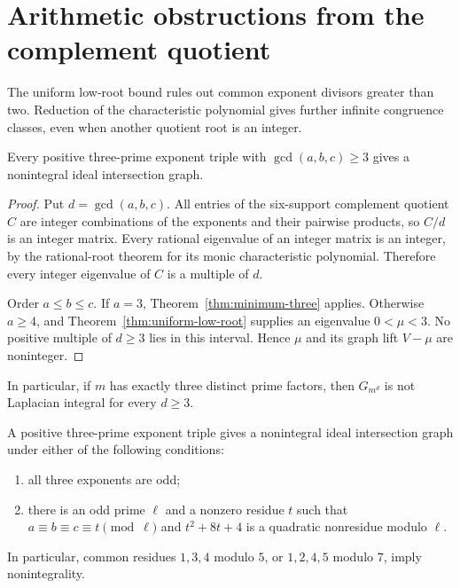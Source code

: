\section{Arithmetic obstructions from the complement quotient}
\label{sec:arithmetic}

The uniform low-root bound rules out common exponent divisors greater
than two. Reduction of the characteristic polynomial gives further
infinite congruence classes, even when another quotient root is an integer.

\begin{theorem}
\label{thm:common-divisor}
Every positive three-prime exponent triple with $\gcd(a,b,c)\geq3$
gives a nonintegral ideal intersection graph.
\end{theorem}

\begin{proof}
Put $d=\gcd(a,b,c)$. All entries of the six-support complement quotient
$C$ are integer combinations of the exponents and their pairwise
products, so $C/d$ is an integer matrix. Every rational eigenvalue of
an integer matrix is an integer, by the rational-root theorem for its
monic characteristic polynomial. Therefore every integer eigenvalue
of $C$ is a multiple of $d$.

Order $a\leq b\leq c$. If $a=3$, Theorem~\ref{thm:minimum-three}
applies. Otherwise $a\geq4$, and Theorem~\ref{thm:uniform-low-root}
supplies an eigenvalue $0<\mu<3$. No positive multiple of $d\geq3$
lies in this interval. Hence $\mu$ and its graph lift $V-\mu$ are
noninteger.
\end{proof}

In particular, if $m$ has exactly three distinct prime factors, then
$G_{m^d}$ is not Laplacian integral for every $d\geq3$.

\begin{theorem}
\label{thm:congruence}
A positive three-prime exponent triple gives a nonintegral ideal
intersection graph under either of the following conditions:
\begin{enumerate}
\item all three exponents are odd;
\item there is an odd prime $\ell$ and a nonzero residue $t$ such that
$a\equiv b\equiv c\equiv t\pmod\ell$ and $t^2+8t+4$ is a quadratic
nonresidue modulo $\ell$.
\end{enumerate}
In particular, common residues $1,3,4$ modulo $5$, or $1,2,4,5$ modulo
$7$, imply nonintegrality.
\end{theorem}

